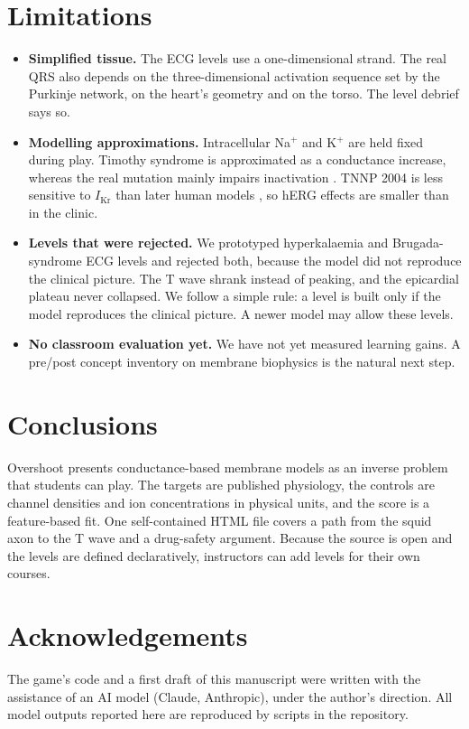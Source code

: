 \documentclass[11pt,a4paper]{article}
\newcommand{\IKr}{I_{\mathrm{Kr}}}
\begin{document}
\section{Limitations}\label{sec:limits}

\begin{itemize}
\item \textbf{Simplified tissue.} The ECG levels use a one-dimensional strand. The real QRS also depends on the three-dimensional activation sequence set by the Purkinje network, on the heart's geometry and on the torso. The level debrief says so.
\item \textbf{Modelling approximations.} Intracellular Na$^+$ and K$^+$ are held fixed during play. Timothy syndrome is approximated as a conductance increase, whereas the real mutation mainly impairs inactivation \cite{Splawski2004}. TNNP 2004 is less sensitive to $\IKr$ than later human models \cite{OHara2011}, so hERG effects are smaller than in the clinic.
\item \textbf{Levels that were rejected.} We prototyped hyperkalaemia and Brugada-syndrome ECG levels and rejected both, because the model did not reproduce the clinical picture. The T wave shrank instead of peaking, and the epicardial plateau never collapsed. We follow a simple rule: a level is built only if the model reproduces the clinical picture. A newer model may allow these levels.
\item \textbf{No classroom evaluation yet.} We have not yet measured learning gains. A pre/post concept inventory on membrane biophysics is the natural next step.
\end{itemize}

\section{Conclusions}

Overshoot presents conductance-based membrane models as an inverse problem that students can play. The targets are published physiology, the controls are channel densities and ion concentrations in physical units, and the score is a feature-based fit. One self-contained HTML file covers a path from the squid axon to the T wave and a drug-safety argument. Because the source is open and the levels are defined declaratively, instructors can add levels for their own courses.

\section*{Acknowledgements}
The game's code and a first draft of this manuscript were written with the assistance of an AI model (Claude, Anthropic), under the author's direction. All model outputs reported here are reproduced by scripts in the repository.



\end{document}

